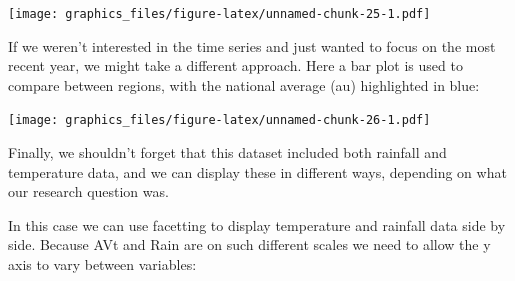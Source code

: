 \documentclass[]{article}
\newenvironment{Shaded}{\begin{snugshade}}{\end{snugshade}}
\newcommand{\DataTypeTok}[1]{\textcolor[rgb]{0.13,0.29,0.53}{#1}}
\newcommand{\DecValTok}[1]{\textcolor[rgb]{0.00,0.00,0.81}{#1}}
\newcommand{\KeywordTok}[1]{\textcolor[rgb]{0.13,0.29,0.53}{\textbf{#1}}}
\newcommand{\NormalTok}[1]{#1}
\newcommand{\OperatorTok}[1]{\textcolor[rgb]{0.81,0.36,0.00}{\textbf{#1}}}
\newcommand{\StringTok}[1]{\textcolor[rgb]{0.31,0.60,0.02}{#1}}
\begin{document}
\texttt{[image: graphics\_files/figure-latex/unnamed-chunk-25-1.pdf]}

If we weren't interested in the time series and just wanted to focus on the most
recent year, we might take a different approach. Here a bar plot is used to
compare between regions, with the national average (au) highlighted in blue:

\begin{Shaded}
\end{Shaded}

\texttt{[image: graphics\_files/figure-latex/unnamed-chunk-26-1.pdf]}

Finally, we shouldn't forget that this dataset included both rainfall and
temperature data, and we can display these in different ways, depending on what
our research question was.

In this case we can use facetting to display temperature and rainfall data side
by side. Because AVt and Rain are on such different scales we need to allow the
y axis to vary between variables:

\begin{Shaded}
\end{Shaded}
\end{document}
